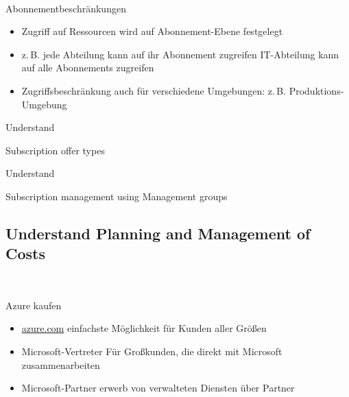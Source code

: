 \documentclass{scrartcl}
\newenvironment{flashcard}[2][]{%
    #1
    \vfill
    \centerline{\Large{#2}}
    \vfill
\newpage
}
{\newpage}
\newcommand{\subsectioncard}[1]{
    \vspace*{\stretch{1}}
    \subsection{#1}
    \vspace*{\stretch{1}}
    \pagebreak
}
\begin{document}
    \begin{flashcard}[\ ]{Abonnementbeschränkungen}
        \begin{itemize}
            \item Zugriff auf Ressourcen wird auf Abonnement-Ebene festgelegt
            \item z.\,B. jede Abteilung kann auf ihr Abonnement zugreifen\newline
            IT-Abteilung kann auf alle Abonnements zugreifen
            \item Zugriffsbeschränkung auch für verschiedene Umgebungen:\newline
            z.\,B. Produktions-Umgebung
        \end{itemize}
    \end{flashcard}

    \begin{flashcard}[Understand]{Subscription offer types}

    \end{flashcard}

    \begin{flashcard}[Understand]{Subscription management using Management groups}

    \end{flashcard}

    \subsectioncard{Understand Planning and Management of Costs}

    \begin{flashcard}[\ ]{Azure kaufen}
        \begin{itemize}
            \item \href{azure.com}{azure.com}\newline
            einfachste Möglichkeit für Kunden aller Größen
            \item Microsoft-Vertreter\newline
            Für Großkunden, die direkt mit Microsoft zusammenarbeiten
            \item Microsoft-Partner\newline
            erwerb von verwalteten Diensten über Partner
        \end{itemize}
    \end{flashcard}
\end{document}
